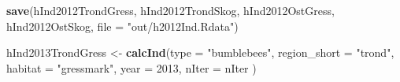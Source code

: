 \documentclass[]{article}
\newenvironment{Shaded}{\begin{snugshade}}{\end{snugshade}}
\newcommand{\KeywordTok}[1]{\textcolor[rgb]{0.13,0.29,0.53}{\textbf{#1}}}
\newcommand{\DataTypeTok}[1]{\textcolor[rgb]{0.13,0.29,0.53}{#1}}
\newcommand{\DecValTok}[1]{\textcolor[rgb]{0.00,0.00,0.81}{#1}}
\newcommand{\StringTok}[1]{\textcolor[rgb]{0.31,0.60,0.02}{#1}}
\newcommand{\NormalTok}[1]{#1}
\begin{document}
\begin{Shaded}
\begin{Highlighting}[]
\KeywordTok{save}\NormalTok{(hInd2012TrondGress, hInd2012TrondSkog, hInd2012OstGress, hInd2012OstSkog, }\DataTypeTok{file =} \StringTok{"out/h2012Ind.Rdata"}\NormalTok{)}
\end{Highlighting}
\end{Shaded}

\begin{Shaded}
\begin{Highlighting}[]
\NormalTok{hInd2013TrondGress <-}\StringTok{ }\KeywordTok{calcInd}\NormalTok{(}\DataTypeTok{type =} \StringTok{"bumblebees"}\NormalTok{,}
                              \DataTypeTok{region_short =} \StringTok{"trond"}\NormalTok{,}
                              \DataTypeTok{habitat =} \StringTok{"gressmark"}\NormalTok{,}
                              \DataTypeTok{year =} \DecValTok{2013}\NormalTok{,}
                              \DataTypeTok{nIter =}\NormalTok{ nIter}
\NormalTok{                              )}
       

\end{Highlighting}
\end{Shaded}
\end{document}
